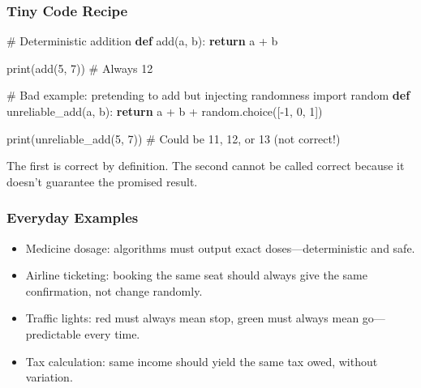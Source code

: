 \documentclass[
  letterpaper,
  DIV=11,
  numbers=noendperiod]{scrreprt}
\newenvironment{Shaded}{\begin{snugshade}}{\end{snugshade}}
\newcommand{\BuiltInTok}[1]{\textcolor[rgb]{0.00,0.23,0.31}{#1}}
\newcommand{\CommentTok}[1]{\textcolor[rgb]{0.37,0.37,0.37}{#1}}
\newcommand{\ControlFlowTok}[1]{\textcolor[rgb]{0.00,0.23,0.31}{\textbf{#1}}}
\newcommand{\DecValTok}[1]{\textcolor[rgb]{0.68,0.00,0.00}{#1}}
\newcommand{\ImportTok}[1]{\textcolor[rgb]{0.00,0.46,0.62}{#1}}
\newcommand{\KeywordTok}[1]{\textcolor[rgb]{0.00,0.23,0.31}{\textbf{#1}}}
\newcommand{\NormalTok}[1]{\textcolor[rgb]{0.00,0.23,0.31}{#1}}
\newcommand{\OperatorTok}[1]{\textcolor[rgb]{0.37,0.37,0.37}{#1}}
\providecommand{\tightlist}{%
  \setlength{\itemsep}{0pt}\setlength{\parskip}{0pt}}
\begin{document}
\subsubsection{Tiny Code Recipe}\label{tiny-code-recipe-21}

\begin{Shaded}
\begin{Highlighting}[]
\CommentTok{\# Deterministic addition}
\KeywordTok{def}\NormalTok{ add(a, b):}
    \ControlFlowTok{return}\NormalTok{ a }\OperatorTok{+}\NormalTok{ b}

\BuiltInTok{print}\NormalTok{(add(}\DecValTok{5}\NormalTok{, }\DecValTok{7}\NormalTok{))  }\CommentTok{\# Always 12}

\CommentTok{\# Bad example: pretending to add but injecting randomness}
\ImportTok{import}\NormalTok{ random}
\KeywordTok{def}\NormalTok{ unreliable\_add(a, b):}
    \ControlFlowTok{return}\NormalTok{ a }\OperatorTok{+}\NormalTok{ b }\OperatorTok{+}\NormalTok{ random.choice([}\OperatorTok{{-}}\DecValTok{1}\NormalTok{, }\DecValTok{0}\NormalTok{, }\DecValTok{1}\NormalTok{])}

\BuiltInTok{print}\NormalTok{(unreliable\_add(}\DecValTok{5}\NormalTok{, }\DecValTok{7}\NormalTok{))  }\CommentTok{\# Could be 11, 12, or 13 (not correct!)}
\end{Highlighting}
\end{Shaded}

The first is correct by definition. The second cannot be called correct
because it doesn't guarantee the promised result.

\subsubsection{Everyday Examples}\label{everyday-examples-22}

\begin{itemize}
\tightlist
\item
  Medicine dosage: algorithms must output exact doses---deterministic
  and safe.
\item
  Airline ticketing: booking the same seat should always give the same
  confirmation, not change randomly.
\item
  Traffic lights: red must always mean stop, green must always mean
  go---predictable every time.
\item
  Tax calculation: same income should yield the same tax owed, without
  variation.
\end{itemize}
\end{document}
